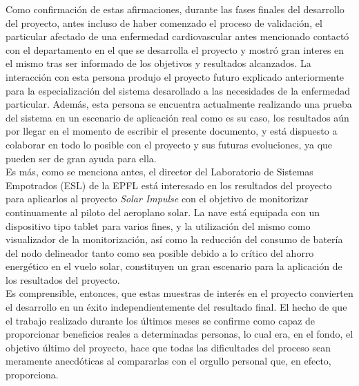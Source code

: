 	Como confirmación de estas afirmaciones, durante las fases finales del desarrollo del proyecto, antes incluso de haber comenzado el proceso de validación, el particular afectado de una enfermedad cardiovascular antes mencionado contactó con el departamento en el que se desarrolla el proyecto y mostró gran interes en el mismo tras ser informado de los objetivos y resultados alcanzados. La interacción con esta persona produjo el proyecto futuro explicado anteriormente para la especialización del sistema desarollado a las necesidades de la enfermedad particular. Además, esta persona se encuentra actualmente realizando una prueba del sistema en un escenario de aplicación real como es su caso, los resultados aún por llegar en el momento de escribir el presente documento, y está dispuesto a colaborar en todo lo posible con el proyecto y sus futuras evoluciones, ya que pueden ser de gran ayuda para ella.\\

	Es más, como se menciona antes, el director del Laboratorio de Sistemas Empotrados (ESL) de la EPFL está interesado en los resultados del proyecto para aplicarlos al proyecto \emph{Solar Impulse} con el objetivo de monitorizar continuamente al piloto del aeroplano solar. La nave está equipada con un dispositivo tipo tablet para varios fines, y la utilización del mismo como visualizador de la monitorización, así como la reducción del consumo de batería del nodo delineador tanto como sea posible debido a lo crítico del ahorro energético en el vuelo solar, constituyen un gran escenario para la aplicación de los resultados del proyecto.\\

	Es comprensible, entonces, que estas muestras de interés en el proyecto convierten el desarrollo en un éxito independientemente del resultado final. El hecho de que el trabajo realizado durante los últimos meses se confirme como capaz de proporcionar beneficios reales a determinadas personas, lo cual era, en el fondo, el objetivo último del proyecto, hace que todas las dificultades del proceso sean meramente anecdóticas al compararlas con el orgullo personal que, en efecto, proporciona.\\
	
